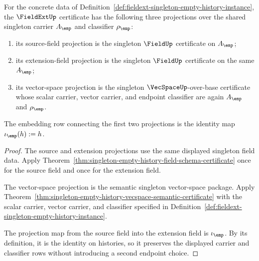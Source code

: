 \begin{theorem}
\label{thm:fieldext-singleton-certificate-projections}
For the concrete data of
Definition~\ref{def:fieldext-singleton-empty-history-instance}, the
$\FieldExtUp$ certificate has the following three projections over the shared
singleton carrier $A_{\emp}$ and classifier $\rho_{\emp}$:
\begin{enumerate}
  \item its source-field projection is the singleton $\FieldUp$
  certificate on $A_{\emp}$;
  \item its extension-field projection is the singleton $\FieldUp$
  certificate on the same $A_{\emp}$;
  \item its vector-space projection is the singleton $\VecSpaceUp$-over-base
  certificate whose scalar carrier, vector carrier, and endpoint classifier
  are again $A_{\emp}$ and $\rho_{\emp}$.
\end{enumerate}
The embedding row connecting the first two projections is the identity map
$\iota_{\emp}(h):=h$.
\end{theorem}
\begin{proof}
The source and extension projections use the same displayed singleton field
data. Apply
Theorem~\ref{thm:singleton-empty-history-field-schema-certificate} once for
the source field and once for the extension field.

The vector-space projection is the semantic singleton vector-space package.
Apply Theorem~\ref{thm:singleton-empty-history-vecspace-semantic-certificate}
with the scalar carrier, vector carrier, and classifier specified in
Definition~\ref{def:fieldext-singleton-empty-history-instance}.

The projection map from the source field into the extension field is
$\iota_{\emp}$. By its definition, it is the identity on histories, so it
preserves the displayed carrier and classifier rows without introducing a
second endpoint choice.
\end{proof}

